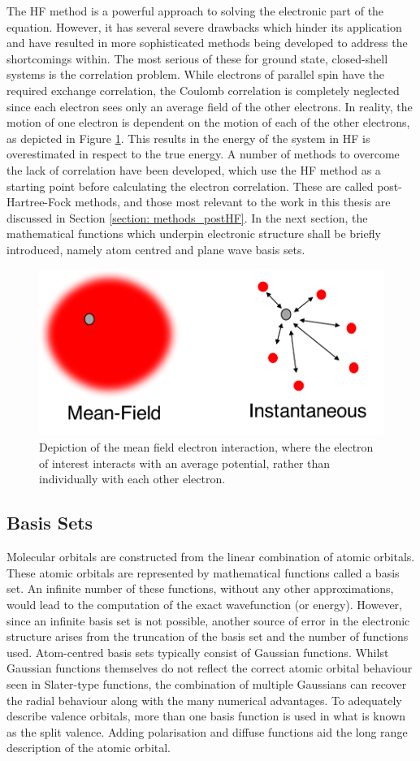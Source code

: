 The \ac{HF} method is a powerful approach to solving the electronic part of the \schro{} equation. However, it has several severe drawbacks which hinder its application and have resulted in more sophisticated methods being developed to address the shortcomings within. The most serious of these for ground state, closed-shell systems is the correlation problem. While electrons of parallel spin have the required exchange correlation, the Coulomb correlation is completely neglected since each electron sees only an average field of the other electrons. In reality, the motion of one electron is dependent on the motion of each of the other electrons, as depicted in Figure \ref{figure: mean-field}. This results in the energy of the system in \ac{HF} is overestimated in respect to the true energy. A number of methods to overcome the lack of correlation have been developed, which use the \ac{HF} method as a starting point before calculating the electron correlation. These are called post-Hartree-Fock methods, and those most relevant to the work in this thesis are discussed in Section \ref{section: methods_postHF}. In the next section, the mathematical functions which underpin electronic structure shall be briefly introduced, namely atom centred and plane wave basis sets. 
\begin{figure}[t]
\centering
  \includegraphics[width=0.4\linewidth]{2Theory/Mean_Field.pdf}
  \caption[Schematic of the mean-field approximation]{Depiction of the mean field electron interaction, where the electron of interest interacts with an average potential, rather than individually with each other electron.}
  \label{figure: mean-field}
\end{figure}
\subsection{Basis Sets}\label{section: methods_basisets}
Molecular orbitals are constructed from the linear combination of atomic orbitals. These atomic orbitals are represented by mathematical functions called a basis set. An infinite number of these functions, without any other approximations, would lead to the computation of the exact wavefunction (or energy). However, since an infinite basis set is not possible, another source of error in the electronic structure arises from the truncation of the basis set and the number of functions used. Atom-centred basis sets typically consist of Gaussian functions. Whilst Gaussian functions themselves do not reflect the correct atomic orbital behaviour seen in Slater-type functions, the combination of multiple Gaussians can recover the radial behaviour along with the many numerical advantages. To adequately describe valence orbitals, more than one basis function is used in what is known as the split valence. Adding polarisation and diffuse functions aid the long range description of the atomic orbital.

